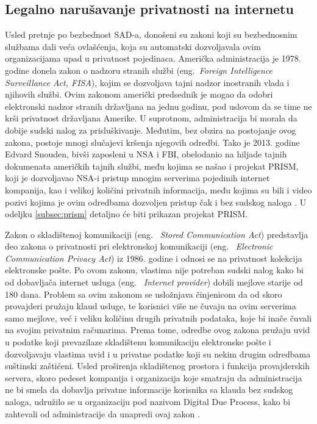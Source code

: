 \documentclass[a4paper]{article}
\begin{document}
\subsection{Legalno narušavanje privatnosti na internetu}
\label{subsec:zakoni}
\par Usled pretnje po bezbednost SAD-a, donošeni su zakoni koji su bezbednosnim službama dali veća ovlašćenja, koja su automatski dozvoljavala ovim organizacijama upad u privatnost pojedinaca. Američka administracija je 1978. godine donela zakon o nadzoru stranih službi (eng.~{\em Foreign Intelligence Surveillance Act, FISA}), kojim se dozvoljava tajni nadzor inostranih vlada i njihovih službi. Ovim zakonom američki predsednik je mogao da odobri elektronski nadzor stranih državljana na jednu godinu, pod uslovom da se time ne krši privatnost državljana Amerike. U suprotnom, administracija bi morala da dobije sudski nalog za prisluškivanje. Međutim, bez obzira na postojanje ovog zakona, postoje mnogi slučajevi kršenja njegovih odredbi. Tako je 2013. godine Edvard Snouden, bivši zaposleni u NSA i FBI, obelodanio  na  hiljade  tajnih  dokumenata  američkih tajnih službi, među kojima se našao i projekat PRISM, koji je dozvoljavao NSA-i pristup mnogim serverima pojedinih internet kompanija, kao i velikoj količini privatnih informacija, među kojima su bili i video pozivi kojima je ovim odredbama dozvoljen pristup čak i bez sudskog naloga \cite{prism}. U odeljku \ref{subsec:prism} detaljno će biti prikazan projekat PRISM.
\par Zakon o skladištenoj komunikaciji (eng. ~{\em Stored Communication Act}) predstavlja deo zakona o privatnosti pri elektronskoj komunikaciji (eng. ~{\em Electronic Communication Privacy Act}) iz 1986. godine i odnosi se na privatnost kolekcija elektronske pošte. Po ovom zakonu, vlastima nije potreban sudski nalog kako bi od dobavljača internet usluga (eng. ~{\em Internet provider}) dobili mejlove starije od 180 dana. Problem sa ovim zakonom se usložnjava činjenicom da od skoro provajderi pružaju klaud usluge, te korisnici više ne čuvaju na ovim serverima samo mejlove, već i veliku količinu drugih privatnih podataka, koje bi inače čuvali na svojim privatnim računarima. Prema tome, odredbe ovog zakona pružaju uvid u podatke koji prevazilaze skladištenu komunikaciju elektronske pošte i dozvoljavaju vlastima uvid i u privatne podatke koji su nekim drugim odredbama suštinski zaštićeni. Usled proširenja skladištenog prostora i funkcija provajderskih servera, skoro pedeset kompanija i organizacija koje smatraju da administracija ne bi smela da dobavlja privatne informacije korisnika sa klauda bez sudskog naloga, udružilo se u organizaciju pod nazivom Digital Due Process, kako bi zahtevali od administracije da unapredi ovaj zakon \cite{ddp}.
\end{document}
